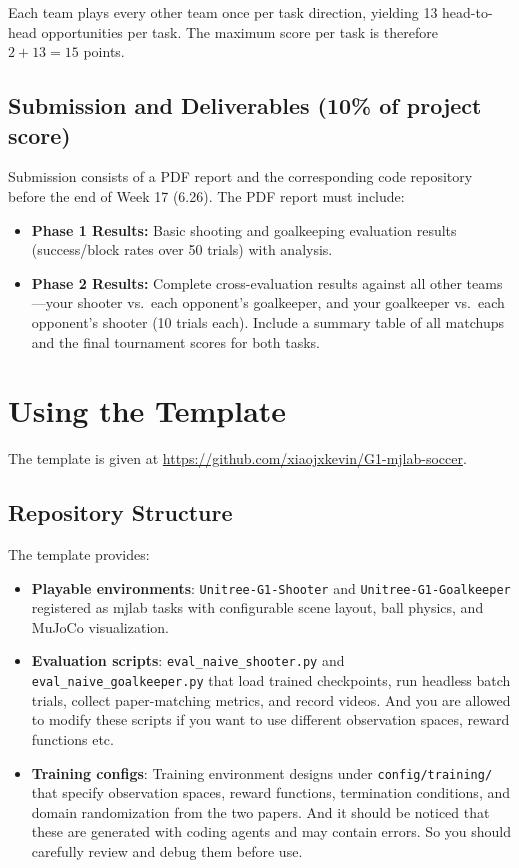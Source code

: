 \documentclass{article}
\begin{document}
Each team plays every other team once per task direction, yielding 13 head-to-head opportunities per task. The maximum score per task is therefore $2 + 13 = 15$ points.

\subsection{Submission and Deliverables (10\% of project score)}
Submission consists of a PDF report and the corresponding code repository before the end of Week 17 (6.26). The PDF report must include:
\begin{itemize}
    \item \textbf{Phase 1 Results:} Basic shooting and goalkeeping evaluation results (success/block rates over 50 trials) with analysis.
    \item \textbf{Phase 2 Results:} Complete cross-evaluation results against all other teams---your shooter vs.\ each opponent's goalkeeper, and your goalkeeper vs.\ each opponent's shooter (10 trials each). Include a summary table of all matchups and the final tournament scores for both tasks.
\end{itemize}


\section{Using the Template}

The template is given at \href{https://github.com/xiaojxkevin/G1-mjlab-soccer}{https://github.com/xiaojxkevin/G1-mjlab-soccer}.

\subsection{Repository Structure}

The template provides:

\begin{itemize}
  \item \textbf{Playable environments}: \texttt{Unitree-G1-Shooter} and \texttt{Unitree-G1-Goalkeeper} registered as mjlab tasks with configurable scene layout, ball physics, and MuJoCo visualization.
  \item \textbf{Evaluation scripts}: \texttt{eval\_naive\_shooter.py} and \texttt{eval\_naive\_goalkeeper.py} that load trained checkpoints, run headless batch trials, collect paper-matching metrics, and record videos. And you are allowed to modify these scripts if you want to use different observation spaces, reward functions etc.
  \item \textbf{Training configs}: Training environment designs under \texttt{config/training/} that specify observation spaces, reward functions, termination conditions, and domain randomization from the two papers. And it should be noticed that these are generated with coding agents and may contain errors. So you should carefully review and debug them before use.
\end{itemize}
\end{document}

